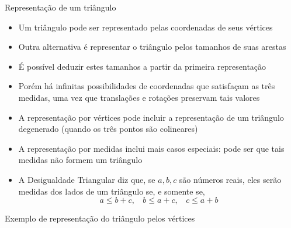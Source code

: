 \begin{frame}[fragile]{Representação de um triângulo}

    \begin{itemize}
        \item Um triângulo pode ser representado pelas coordenadas de seus vértices
        \pause

        \item Outra alternativa é representar o triângulo pelos tamanhos de suas arestas
        \pause

        \item É possível deduzir estes tamanhos a partir da primeira representação
        \pause

        \item Porém há infinitas possibilidades de coordenadas que satisfaçam as três medidas,
            uma vez que translações e rotações preservam tais valores
        \pause

        \item A representação por vértices pode incluir a representação de um triângulo degenerado
            (quando os três pontos são colineares)
        \pause

        \item A representação por medidas inclui mais casos especiais: pode ser que tais
            medidas não formem um triângulo
        \pause

        \item A Desigualdade Triangular diz que, se $a, b, c$ são números reais, eles serão
            medidas dos lados de um triângulo se, e somente se,
        \[
            a \leq b + c,\ \ \ \ b \leq a + c,\ \ \ \ c\leq a + b
        \]
    \end{itemize}

\end{frame}

\begin{frame}[fragile]{Exemplo de representação do triângulo pelos vértices}
\end{frame}
